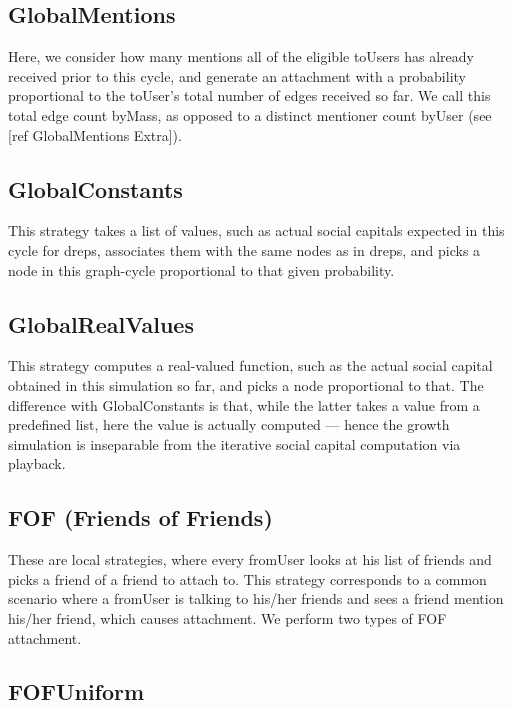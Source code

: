 \documentclass[10pt,oneside]{memoir}
\begin{document}
\subsection{GlobalMentions}
\label{globalmentions}

Here, we consider how many mentions all of the eligible toUsers has already received prior to this cycle, and generate an attachment with a probability proportional to the toUser's total number of edges received so far. We call this total edge count byMass, as opposed to a distinct mentioner count byUser (see [ref GlobalMentions Extra]).


\subsection{GlobalConstants}
\label{globalconstants}

This strategy takes a list of values, such as actual social capitals expected in this cycle for dreps, associates them with the same nodes as in dreps, and picks a node in this graph-cycle proportional to that given probability.


\subsection{GlobalRealValues}
\label{globalrealvalues}

This strategy computes a real-valued function, such as the actual social capital obtained in this simulation so far, and picks a node proportional to that.  The difference with GlobalConstants is that, while the latter takes a value from a predefined list, here the value is actually computed --- hence the growth simulation is inseparable from the iterative social capital computation via playback.


\subsection{FOF (Friends of Friends)}
\label{foffriendsoffriends}

These are local strategies, where every fromUser looks at his list of friends and picks a friend of a friend to attach to.  This strategy corresponds to a common scenario where a fromUser is talking to his/her friends and sees a friend mention his/her friend, which causes attachment.  We perform two types of FOF attachment.


\subsection{FOFUniform}
\label{fofuniform}
\end{document}
